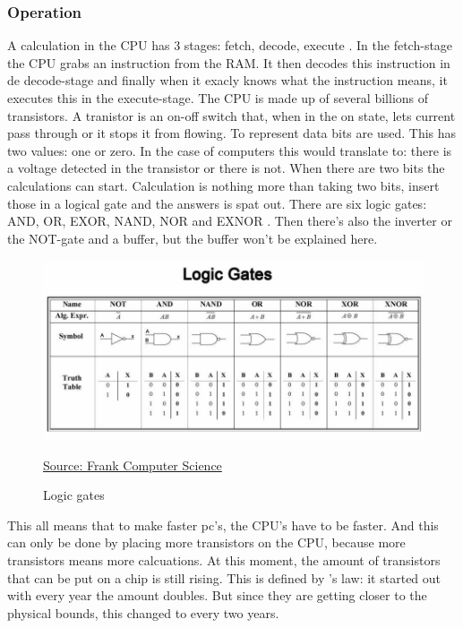 \subsubsection{Operation} \label{working}
A calculation in the CPU has 3 stages: fetch, decode, execute \autocite{cpu}.
In the fetch-stage the CPU grabs an instruction from the RAM. It then decodes this instruction in de decode-stage and finally when it exacly knows what the instruction means, it executes this in the execute-stage.
The CPU is made up of several billions of transistors. A tranistor is an on-off switch that, when in the on state, lets current pass through or it stops it from flowing.
To represent data bits are used. This has two values: one or zero\autocite{bit}. In the case of computers this would translate to: there is a voltage detected in the transistor or there is not.
When there are two bits the calculations can start. Calculation is nothing more than taking two bits, insert those in a logical gate and the answers is spat out.
There are six logic gates: AND, OR, EXOR, NAND, NOR and EXNOR \autocite{gates}. Then there's also the inverter or the NOT-gate and a buffer, but the buffer won't be explained here.

\begin{figure} [h]
    \centering
    \includegraphics[width=\textwidth]{img/gates.jpg}
        \caption{Logic gates}
        \label{fig:logicGates}
        \href{https://frankcomputerscience.wordpress.com/chapter-3/}{Source: Frank Computer Science}
\end{figure}

This all means that to make faster pc's, the CPU's have to be faster. And this can only be done by placing more transistors on the CPU, because more transistors means more calcuations.
At this moment, the amount of transistors that can be put on a chip is still rising. This is defined by \textcite{Moore1965}'s law: it started out with every year the amount doubles. But since they are getting closer to the physical bounds, this changed to every two years.


